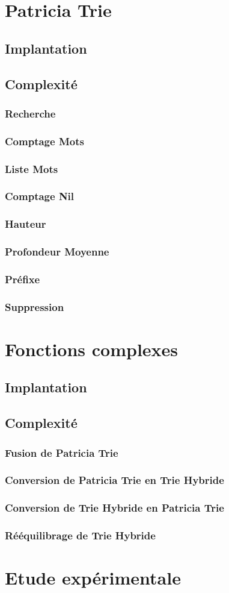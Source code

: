 \documentclass[a4paper,12pt]{report}
\begin{document}
\chapter{Patricia Trie}
\section{Implantation}
\section{Complexité}
\subsection{Recherche}
\subsection{Comptage Mots}
\subsection{Liste Mots}
\subsection{Comptage Nil}
\subsection{Hauteur}
\subsection{Profondeur Moyenne}
\subsection{Préfixe}
\subsection{Suppression}
\chapter{Fonctions complexes}
\section{Implantation}
\section{Complexité}
\subsection{Fusion de Patricia Trie}
\subsection{Conversion de Patricia Trie en Trie Hybride}
\subsection{Conversion de Trie Hybride en Patricia Trie}
\subsection{Rééquilibrage de Trie Hybride}
\chapter{Etude expérimentale}
\end{document}
